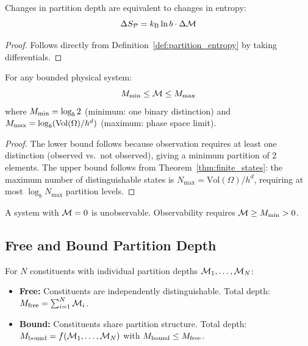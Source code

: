 \begin{theorem}
\label{thm:depth_entropy}
Changes in partition depth are equivalent to changes in entropy:
\begin{equation}
    \Delta S_{\mathcal{P}} = k_{\mathrm{B}} \ln b \cdot \Delta\mathcal{M}
\end{equation}
\end{theorem}

\begin{proof}
Follows directly from Definition~\ref{def:partition_entropy} by taking differentials.
\end{proof}

\begin{theorem}
\label{thm:depth_bounds}
For any bounded physical system:
\begin{equation}
    M_{\mathrm{min}} \leq \mathcal{M} \leq M_{\mathrm{max}}
\end{equation}
where $M_{\mathrm{min}} = \log_b 2$ (minimum: one binary distinction) and $M_{\mathrm{max}} = \log_b({\mathrm{Vol}(\Omega)}/{h^d})$ (maximum: phase space limit).
\end{theorem}

\begin{proof}
The lower bound follows because observation requires at least one distinction (observed vs.\ not observed), giving a minimum partition of 2 elements. The upper bound follows from Theorem~\ref{thm:finite_states}: the maximum number of distinguishable states is $N_{\max} = \mathrm{Vol}(\Omega)/h^d$, requiring at most $\log_b N_{\max}$ partition levels.
\end{proof}

\begin{corollary}
\label{cor:observability}
A system with $\mathcal{M} = 0$ is unobservable. Observability requires $\mathcal{M} \geq M_{\mathrm{min}} > 0$.
\end{corollary}

\subsection{Free and Bound Partition Depth}

\begin{definition}
\label{def:free_bound}
For $N$ constituents with individual partition depths $\mathcal{M}_1, \ldots, \mathcal{M}_N$:
\begin{itemize}
    \item \textbf{Free:} Constituents are independently distinguishable. Total depth: $M_{\mathrm{free}} = \sum_{i=1}^N \mathcal{M}_i$.
    \item \textbf{Bound:} Constituents share partition structure. Total depth: $M_{\mathrm{bound}} = f(\mathcal{M}_1, \ldots, \mathcal{M}_N)$ with $M_{\mathrm{bound}} \leq M_{\mathrm{free}}$.
\end{itemize}
\end{definition}

